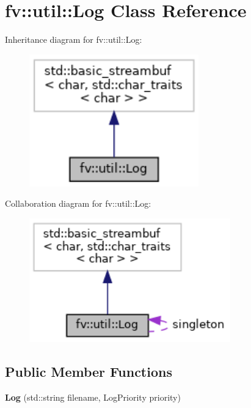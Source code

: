\hypertarget{classfv_1_1util_1_1Log}{}\section{fv\+:\+:util\+:\+:Log Class Reference}
\label{classfv_1_1util_1_1Log}


Inheritance diagram for fv\+:\+:util\+:\+:Log\+:
\nopagebreak
\begin{figure}[H]
\begin{center}
\leavevmode
\includegraphics[width=208pt]{classfv_1_1util_1_1Log__inherit__graph}
\end{center}
\end{figure}


Collaboration diagram for fv\+:\+:util\+:\+:Log\+:
\nopagebreak
\begin{figure}[H]
\begin{center}
\leavevmode
\includegraphics[width=247pt]{classfv_1_1util_1_1Log__coll__graph}
\end{center}
\end{figure}
\subsection*{Public Member Functions}
\begin{DoxyCompactItemize}
\item 
\hypertarget{classfv_1_1util_1_1Log_a0e6f9d1a3088e9176d0a48b6eb104132}{}\label{classfv_1_1util_1_1Log_a0e6f9d1a3088e9176d0a48b6eb104132} 
{\bfseries Log} (std\+::string filename, Log\+Priority priority)
\end{DoxyCompactItemize}
